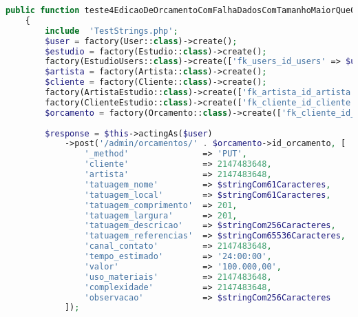\begin{lstlisting}[language=PHP, caption= Scripts de teste de Edição de Orçamentos, nolol,
label={code:EdicaoDeOrcamentoTest}]
    public function teste4EdicaoDeOrcamentoComFalhaDadosComTamanhoMaiorQueOSuportado()
    {   
        include  'TestStrings.php';
        $user = factory(User::class)->create();
        $estudio = factory(Estudio::class)->create();
        factory(EstudioUsers::class)->create(['fk_users_id_users' => $user->id, 'fk_estudio_id_estudio' => $estudio->id_estudio]);
        $artista = factory(Artista::class)->create();
        $cliente = factory(Cliente::class)->create();
        factory(ArtistaEstudio::class)->create(['fk_artista_id_artista' => $artista->id_artista, 'fk_estudio_id_estudio' => $estudio->id_estudio]);
        factory(ClienteEstudio::class)->create(['fk_cliente_id_cliente' => $cliente->id_cliente, 'fk_estudio_id_estudio' => $estudio->id_estudio]);
        $orcamento = factory(Orcamento::class)->create(['fk_cliente_id_cliente' => $cliente->id_cliente, 'fk_artista_id_artista' => $artista->id_artista, 'fk_estudio_id_estudio' => $estudio->id_estudio, 'fk_orcamento_status_id_orcamento_status' => 1]);
        
        $response = $this->actingAs($user)
            ->post('/admin/orcamentos/' . $orcamento->id_orcamento, [
                '_method'               => 'PUT',
                'cliente'               => 2147483648,
                'artista'               => 2147483648,
                'tatuagem_nome'         => $stringCom61Caracteres,
                'tatuagem_local'        => $stringCom61Caracteres,
                'tatuagem_comprimento'  => 201,
                'tatuagem_largura'      => 201,
                'tatuagem_descricao'    => $stringCom256Caracteres,
                'tatuagem_referencias'  => $stringCom65536Caracteres,
                'canal_contato'         => 2147483648,
                'tempo_estimado'        => '24:00:00',
                'valor'                 => '100.000,00',
                'uso_materiais'         => 2147483648,
                'complexidade'          => 2147483648,
                'observacao'            => $stringCom256Caracteres
            ]);


\end{lstlisting}
